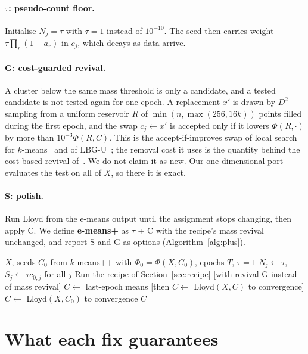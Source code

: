 \documentclass[11pt]{article}
\theoremstyle{remark}
\begin{document}
\paragraph{$\tau$: pseudo-count floor.} Initialise $N_j=\tau$ with $\tau=1$ instead of $10^{-10}$.
The seed then carries weight $\tau\prod_r(1-a_r)$ in $c_j$, which decays as data arrive.

\paragraph{G: cost-guarded revival.} A cluster below the same mass threshold is only a candidate,
and a tested candidate is not tested again for one epoch. A replacement
$x'$ is drawn by $D^2$ sampling from a uniform reservoir $R$ of $\min(n,\max(256,16k))$ points filled during the first epoch, and
the swap $c_j\leftarrow x'$ is accepted only if it lowers $\Phi(R,\cdot)$ by more than $10^{-3}\Phi(R,C)$.
This is the accept-if-improves swap of local search for $k$-means~\cite{kanungo2004} and of
LBG-U~\cite{fritzke1997}; the removal cost it uses is the quantity behind the cost-based revival
of~\cite{pr5915}. We do not claim it as new. Our one-dimensional port evaluates the test on all of
$X$, so there it is exact.

\paragraph{S: polish.} Run Lloyd from the e-means output until the assignment stops changing, then
apply C. We define \textbf{e-means+} as $\tau$ + C with the recipe's mass revival unchanged, and
report S and G as options (Algorithm~\ref{alg:plus}).

\begin{algorithm}[t]
\caption{e-means+ (options in brackets)}\label{alg:plus}
\begin{algorithmic}[1]
\REQUIRE $X$, seeds $C_0$ from $k$-means++ with $\Phi_0=\Phi(X,C_0)$, epochs $T$, $\tau=1$
\STATE $N_j\leftarrow\tau$, $S_j\leftarrow\tau c_{0,j}$ for all $j$
\STATE Run the recipe of Section~\ref{sec:recipe} [with revival G instead of mass revival]
\STATE $C\leftarrow$ last-epoch means [then $C\leftarrow$ Lloyd$(X,C)$ to convergence]
  \STATE $C\leftarrow$ Lloyd$(X,C_0)$ to convergence
\ENDIF
\RETURN $C$
\end{algorithmic}
\end{algorithm}

\section{What each fix guarantees}
\end{document}

